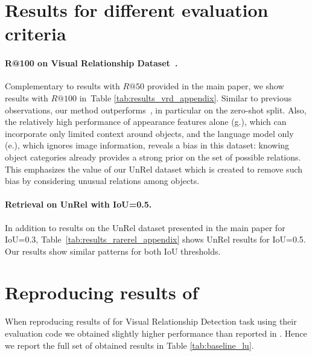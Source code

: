 \documentclass[10pt,twocolumn,letterpaper]{article}
\begin{document}
\section{Results for different evaluation criteria}
\label{part:quantitative}


\paragraph{R@100 on Visual Relationship Dataset~\cite{Lu16}.} Complementary to results with $R@50$ provided in the main paper, we show results with $R@100$ in~Table \ref{tab:results_vrd_appendix}. Similar to previous observations, our method outperforms~\cite{Lu16,Sadeghi2011}, in particular on the zero-shot split. Also, the relatively high performance of appearance features alone (g.), which can incorporate only limited context around objects, and the language model only (e.), which ignores image information, reveals a bias in this dataset: knowing object categories already provides a strong prior on the set of possible relations. This emphasizes the value of our UnRel dataset which is created to remove such bias by considering unusual relations among objects.


\paragraph{Retrieval on UnRel with IoU=0.5.}
In addition to results on the UnRel dataset presented in the main paper for IoU=0.3, Table~\ref{tab:results_rarerel_appendix} shows UnRel results for IoU=0.5. Our results show similar patterns for both IoU thresholds. 


\section{Reproducing results of \cite{Lu16}}
\label{part:lu-baseline}
When reproducing results of \cite{Lu16} for Visual Relationship Detection task using their evaluation code we obtained slightly higher performance than reported in \cite{Lu16}. Hence we report the full set of obtained results in Table \ref{tab:baseline_lu}.
\end{document}
